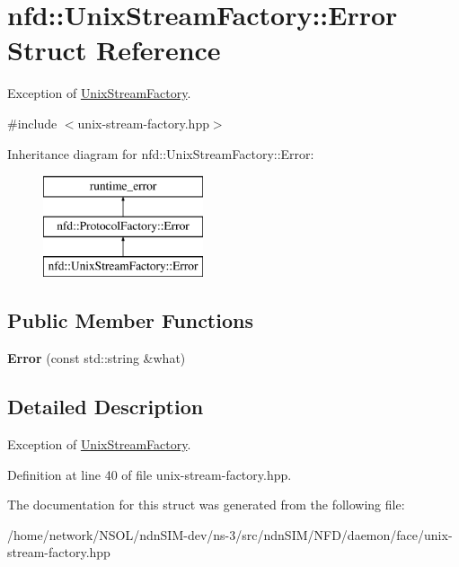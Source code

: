 \hypertarget{structnfd_1_1UnixStreamFactory_1_1Error}{}\section{nfd\+:\+:Unix\+Stream\+Factory\+:\+:Error Struct Reference}
\label{structnfd_1_1UnixStreamFactory_1_1Error}


Exception of \hyperlink{classnfd_1_1UnixStreamFactory}{Unix\+Stream\+Factory}.  




{\ttfamily \#include $<$unix-\/stream-\/factory.\+hpp$>$}

Inheritance diagram for nfd\+:\+:Unix\+Stream\+Factory\+:\+:Error\+:\begin{figure}[H]
\begin{center}
\leavevmode
\includegraphics[height=3.000000cm]{structnfd_1_1UnixStreamFactory_1_1Error}
\end{center}
\end{figure}
\subsection*{Public Member Functions}
\begin{DoxyCompactItemize}
\item 
{\bfseries Error} (const std\+::string \&what)\hypertarget{structnfd_1_1UnixStreamFactory_1_1Error_a8db15e3a1f8961e5d984796add1100e8}{}\label{structnfd_1_1UnixStreamFactory_1_1Error_a8db15e3a1f8961e5d984796add1100e8}

\end{DoxyCompactItemize}


\subsection{Detailed Description}
Exception of \hyperlink{classnfd_1_1UnixStreamFactory}{Unix\+Stream\+Factory}. 

Definition at line 40 of file unix-\/stream-\/factory.\+hpp.



The documentation for this struct was generated from the following file\+:\begin{DoxyCompactItemize}
\item 
/home/network/\+N\+S\+O\+L/ndn\+S\+I\+M-\/dev/ns-\/3/src/ndn\+S\+I\+M/\+N\+F\+D/daemon/face/unix-\/stream-\/factory.\+hpp\end{DoxyCompactItemize}
